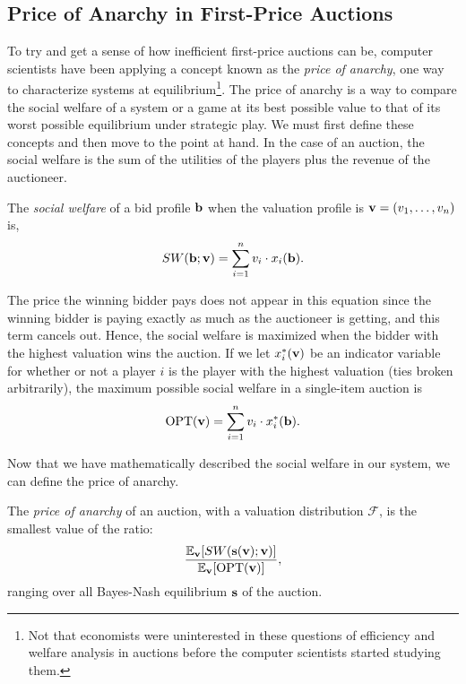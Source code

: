 \documentclass[12pt,twoside]{reedthesis}
\begin{document}
\subsection{Price of Anarchy in First-Price Auctions}  
To try and get a sense of how inefficient first-price auctions can be, computer scientists have been applying a concept known as the {\em price of anarchy}, one way to characterize systems at equilibrium\footnote{Not that economists were uninterested in these questions of efficiency and welfare analysis in auctions before the computer scientists started studying them.}. The price of anarchy is a way to compare the social welfare of a system or a game at its best possible value to that of its worst possible equilibrium under strategic play. We must first define these concepts and then move to the point at hand. In the case of an auction, the social welfare is the sum of the utilities of the players plus the revenue of the auctioneer.

\begin{dfn}
	The \textit{social welfare} of a bid profile $\textbf{b}$ when the valuation profile is $\textbf{v} = (v_1, \ldots, v_n)$ is, 
	$$ SW(\textbf{b};\textbf{v}) = \sum_{i=1}^{n} v_i \cdot x_i (\textbf{b}).$$
	\label{dfn:SocialWelfare}
\end{dfn}

The price the winning bidder pays does not appear in this equation since the winning bidder is paying exactly as much as the auctioneer is getting, and this term cancels out. Hence, the social welfare is maximized when the bidder with the highest valuation wins the auction. If we let $x^*_i(\textbf{v})$ be an indicator variable for whether or not a player $i$ is the player with the highest valuation (ties broken arbitrarily), the maximum possible social welfare in a single-item auction is 
$$ \text{OPT}(\textbf{v}) = \sum_{i=1}^{n} v_i \cdot x^*_i (\textbf{b}).$$

Now that we have mathematically described the social welfare in our system, we can define the price of anarchy. 

\begin{dfn}
	The \textit{price of anarchy} of an auction, with a valuation distribution $\mathcal{F}$, is the smallest value of the ratio:
	\begin{equation}
	\frac{\mathbb{E}_{\textbf{v}} [SW(\textbf{s}(\textbf{v});\textbf{v})]}{\mathbb{E}_{\textbf{v}}[\text{OPT}(\textbf{v})]},
	\label{eq:POA}
	\end{equation}
	ranging over all Bayes-Nash equilibrium $\textbf{s}$ of the auction.
\end{dfn}
\end{document}
